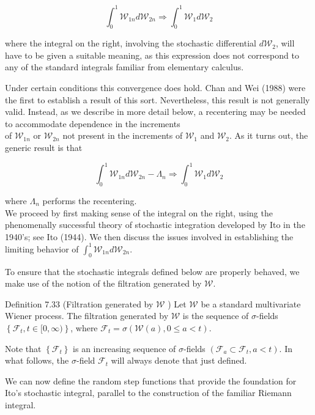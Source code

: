 \documentclass[10pt]{article}
\begin{document}
$$
\int_{0}^{1} \mathcal{W}_{1 n} d \mathcal{W}_{2 n} \Rightarrow \int_{0}^{1} \mathcal{W}_{1} d \mathcal{W}_{2}
$$

where the integral on the right, involving the stochastic differential $d \mathcal{W}_{2}$, will have to be given a suitable meaning, as this expression does not correspond to any of the standard integrals familiar from elementary calculus.

Under certain conditions this convergence does hold. Chan and Wei (1988) were the first to establish a result of this sort. Nevertheless, this result is not generally valid. Instead, as we describe in more detail below, a recentering may be needed to accommodate dependence in the increments\\
of $\mathcal{W}_{1 n}$ or $\mathcal{W}_{2 n}$ not present in the increments of $\mathcal{W}_{1}$ and $\mathcal{W}_{2}$. As it turns out, the generic result is that

$$
\int_{0}^{1} \mathcal{W}_{1 n} d \mathcal{W}_{2 n}-\Lambda_{n} \Rightarrow \int_{0}^{1} \mathcal{W}_{1} d \mathcal{W}_{2}
$$

where $\Lambda_{n}$ performs the recentering.\\
We proceed by first making sense of the integral on the right, using the phenomenally successful theory of stochastic integration developed by Ito in the 1940's; see Ito (1944). We then discuss the issues involved in establishing the limiting behavior of $\int_{0}^{1} \mathcal{W}_{1 n} d \mathcal{W}_{2 n}$.

To ensure that the stochastic integrals defined below are properly behaved, we make use of the notion of the filtration generated by $\mathcal{W}$.

Definition 7.33 (Filtration generated by $\mathcal{W}$ ) Let $\mathcal{W}$ be a standard multivariate Wiener process. The filtration generated by $\mathcal{W}$ is the sequence of $\sigma$-fields $\left\{\mathcal{F}_{t}, t \in[0, \infty)\right\}$, where $\mathcal{F}_{t}=\sigma(\boldsymbol{\mathcal { W }}(a), 0 \leq a<t)$.

Note that $\left\{\mathcal{F}_{t}\right\}$ is an increasing sequence of $\sigma$-fields $\left(\mathcal{F}_{a} \subset \mathcal{F}_{t}, a<t\right)$. In what follows, the $\sigma$-field $\mathcal{F}_{t}$ will always denote that just defined.

We can now define the random step functions that provide the foundation for Ito's stochastic integral, parallel to the construction of the familiar Riemann integral.
\end{document}
